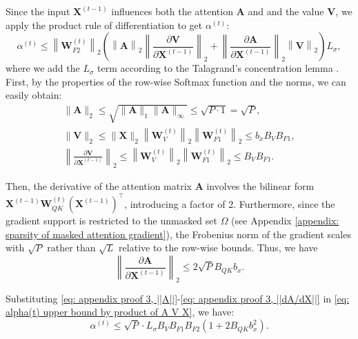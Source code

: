 \documentclass[lettersize,onecolumn]{IEEEtran}
\begin{document}
Since the input $\mathbf{X}^{(t-1)}$ influences both the attention $\mathbf{A}$ and and the value $\mathbf{V}$, we apply the product rule of differentiation to get $\alpha^{(t)}$:
\begin{equation}
    \alpha^{(t)} \leq \left\|\mathbf{W}_{F 2}^{(t)}\right\|_2\left(\left\|\mathbf{A}\right\|_2 \left\|\frac{\partial \mathbf{V}}{\partial \mathbf{X}^{(t-1)}}\right\|_2 + \left\|\frac{\partial \mathbf{A}}{\partial \mathbf{X}^{(t-1)}}\right\|_2 \left\|\mathbf{V}\right\|_2\right)L_{\sigma},
    \label{eq: alpha(t) upper bound by product of A V X}
\end{equation}
where we add the $L_{\sigma}$ term according to the Talagrand’s concentration lemma \cite{ledouxTalagrand2013probability}. First, by the properties of the row-wise Softmax function and the norms, we can easily obtain:
\begin{gather}
    \|\mathbf{A}\|_{2} \leq \sqrt{\|\mathbf{A}\|_{1}\|\mathbf{A}\|_{\infty}} \leq \sqrt{P \cdot 1}=\sqrt{P}, \label{eq: appendix proof 3, ||A||} \\
    \|\mathbf{V}\|_{2} \leq \|\mathbf{X}\|_{2}\left\|\mathbf{W}_{V}^{(t)}\right\|_{2}\left\|\mathbf{W}_{F 1}^{(t)}\right\|_{2} \leq b_{x} B_{V} B_{F 1}, \label{eq: appendix proof 3, ||V||}\\
    \left\|\frac{\partial \mathbf{V}}{\partial \mathbf{X}^{(t-1)}}\right\|_2 \leq \left\|\mathbf{W}_{V}^{(t)}\right\|_{2} \left\|\mathbf{W}_{F 1}^{(t)}\right\|_{2} \leq B_{V}B_{F1}. \label{eq: appendix proof 3, ||dV/dX||}
\end{gather}

Then, the derivative of the attention matrix $\mathbf{A}$ involves the bilinear form $\mathbf{X}^{(t-1)} \mathbf{W}_{Q K}^{(t)} \left(\mathbf{X}^{(t-1)}\right)^{\top}$, introducing a factor of 2. Furthermore, since the gradient support is restricted to the unmasked set $\Omega$ (see Appendix \ref{appendix: sparsity of masked attention gradient}), the Frobenius norm of the gradient scales with $\sqrt{P}$ rather than $\sqrt{L}$ relative to the row-wise bounds. Thus, we have
\begin{equation}
    \left\|\frac{\partial \mathbf{A}}{\partial \mathbf{X}^{(t-1)}}\right\|_2 \leq 2\sqrt{P} B_{QK}b_{x}. \label{eq: appendix proof 3, ||dA/dX||}
\end{equation}

Substituting \eqref{eq: appendix proof 3, ||A||}-\eqref{eq: appendix proof 3, ||dA/dX||} in \eqref{eq: alpha(t) upper bound by product of A V X}, we have:
\begin{equation}
    \alpha^{(t)} \leq \sqrt{P} \cdot L_{\sigma} B_{V} B_{F1}B_{F2} \left( 1 + 2 B_{QK} b_x^2 \right).
    \label{eq: alpha^(t), P-sparse}
\end{equation}
\end{document}
